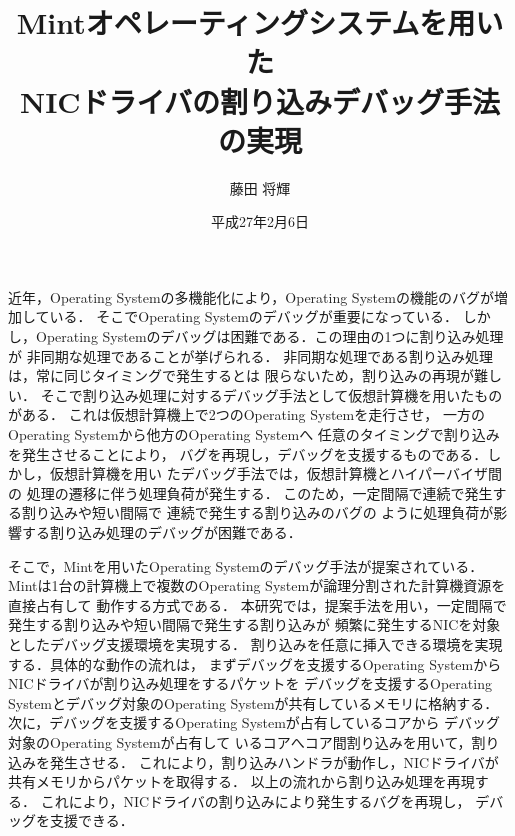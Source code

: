 \documentclass[tanilab-enum]{graduate}
\title{Mintオペレーティングシステムを用いた\\NICドライバの割り込みデバッグ手法の実現}
\author{藤田 将輝}
\date{平成27年2月6日}
\begin{document}
\maketitle

近年，Operating Systemの多機能化により，Operating Systemの機能のバグが増加している．
そこでOperating Systemのデバッグが重要になっている．
しかし，Operating Systemのデバッグは困難である．この理由の1つに割り込み処理が
非同期な処理であることが挙げられる．
非同期な処理である割り込み処理は，常に同じタイミングで発生するとは
限らないため，割り込みの再現が難しい．
そこで割り込み処理に対するデバッグ手法として仮想計算機を用いたものがある．
これは仮想計算機上で2つのOperating Systemを走行させ，
一方のOperating Systemから他方のOperating Systemへ
任意のタイミングで割り込みを発生させることにより，
バグを再現し，デバッグを支援するものである．しかし，仮想計算機を用い
たデバッグ手法では，仮想計算機とハイパーバイザ間の
処理の遷移に伴う処理負荷が発生する．
このため，一定間隔で連続で発生する割り込みや短い間隔で
連続で発生する割り込みのバグの
ように処理負荷が影響する割り込み処理のデバッグが困難である．


そこで，Mintを用いたOperating Systemのデバッグ手法が提案されている．
Mintは1台の計算機上で複数のOperating Systemが論理分割された計算機資源を直接占有して
動作する方式である．
本研究では，提案手法を用い，一定間隔で発生する割り込みや短い間隔で発生する割り込みが
頻繁に発生するNICを対象としたデバッグ支援環境を実現する．
割り込みを任意に挿入できる環境を実現する．具体的な動作の流れは，
まずデバッグを支援するOperating SystemからNICドライバが割り込み処理をするパケットを
デバッグを支援するOperating Systemとデバッグ対象のOperating Systemが共有しているメモリに格納する．
次に，デバッグを支援するOperating Systemが占有しているコアから
デバッグ対象のOperating Systemが占有して
いるコアへコア間割り込みを用いて，割り込みを発生させる．
これにより，割り込みハンドラが動作し，NICドライバが
共有メモリからパケットを取得する．
以上の流れから割り込み処理を再現する．
これにより，NICドライバの割り込みにより発生するバグを再現し，
デバッグを支援できる．


\tableandlists%
\end{document}
